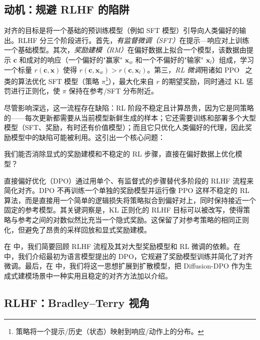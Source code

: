\subsection{动机：规避 RLHF 的陷阱}

对齐的目标是将一个基础的预训练模型（例如 SFT 模型）引导向人类偏好的输出。RLHF 分三个阶段进行。首先，\emph{有监督微调（SFT）}在提示—响应对上训练一个基础模型。其次，\emph{奖励建模（RM）}在偏好数据上拟合一个模型，该数据由提示 $\mathbf{c}$ 和成对的响应（一个偏好的"赢家" $\mathbf{x}_w$ 和一个不偏好的"输家" $\mathbf{x}_l$）组成，学习一个标量 $r(\mathbf{c},\mathbf{x})$ 使得 $r(\mathbf{c},\mathbf{x}_w)>r(\mathbf{c},\mathbf{x}_l)$。第三，\emph{RL 微调}用诸如 PPO~\citep{schulman2017proximal} 之类的算法优化 SFT 模型（策略 $\pi$\footnote{策略将一个提示/历史（状态）映射到响应/动作上的分布。}），最大化来自 $r$ 的期望奖励，同时通过 KL 惩罚进行正则化，使 $\pi$ 保持在参考/SFT 分布附近。

尽管影响深远，这一流程存在缺陷：RL 阶段不稳定且计算昂贵，因为它是同策略的——每次更新都需要从当前模型新鲜生成的样本；它还需要训练和部署多个大型模型（SFT、奖励，有时还有价值模型）；而且它只优化人类偏好的代理，因此奖励模型中的缺陷可能被利用。这引出一个核心问题：
\begin{question}
    我们能否消除显式的奖励建模和不稳定的 RL 步骤，直接在偏好数据上优化模型？
\end{question}

直接偏好优化（DPO）通过用单个、有监督式的步骤替代多阶段的 RLHF 流程来简化对齐。DPO 不再训练一个单独的奖励模型并运行像 PPO 这样不稳定的 RL 算法，而是直接用一个简单的逻辑损失将策略拟合到偏好对上，同时保持接近一个固定的参考模型。其关键洞察是，KL 正则化的 RLHF 目标可以被改写，使得策略与参考之间的对数似然比充当一个隐式奖励。这保留了对参考策略的相同正则化，但避免了昂贵的采样回放和显式奖励建模。

在  中，我们简要回顾 RLHF 流程及其对大型奖励模型和 RL 微调的依赖。在  中，我们介绍最初为语言模型提出的 DPO，它规避了奖励模型训练并简化了对齐微调。最后，在  中，我们将这一思想扩展到扩散模型，把 Diffusion-DPO 作为生成式建模场景中一种实用且稳定的对齐方法加以介绍。

\subsection{RLHF：Bradley--Terry 视角}\label{subsec:rlhf-bradley-terry}



